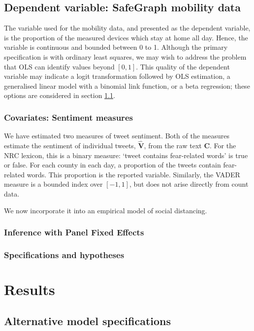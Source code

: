 \documentclass{article}
\begin{document}
\subsection{Dependent variable: SafeGraph mobility data}
The variable used for the mobility data, and presented as the dependent variable, is the proportion of the measured devices which stay at home all day. Hence, the variable is continuous and bounded between 0 to 1. Although the primary specification is with ordinary least squares, we may wish to address the problem that OLS can identify values beyond \([0,1]\). This quality of the dependent variable may indicate a logit transformation followed by OLS estimation, a generalised linear model with a binomial link function, or a beta regression; these options are considered in section \ref{alt-specs}. 

\subsubsection{Covariates: Sentiment measures}
We have estimated two measures of tweet sentiment. Both of the measures estimate the sentiment of individual tweets, \(\hat{\mathbf{V}}\), from the raw text \(\mathbf{C}\). For the NRC lexicon, this is a binary measure: `tweet contains fear-related words' is true or false. For each county in each day, a proportion of the tweets contain fear-related words. This proportion is the reported variable. Similarly, the VADER measure is a bounded index over \([-1,1]\), but does not arise directly from count data. 



We now incorporate it into an empirical model of social distancing.

\subsubsection{Inference with Panel Fixed Effects}


\subsubsection{Specifications and hypotheses}




\section{Results}%
\subsection{Alternative model specifications}\label{alt-specs}
\end{document}
